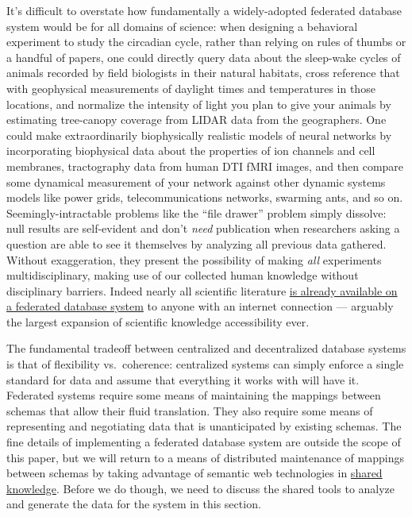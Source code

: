 \documentclass{article}
\begin{document}
It's difficult to overstate how fundamentally a widely-adopted federated
database system would be for all domains of science: when designing a
behavioral experiment to study the circadian cycle, rather than relying
on rules of thumbs or a handful of papers, one could directly query data
about the sleep-wake cycles of animals recorded by field biologists in
their natural habitats, cross reference that with geophysical
measurements of daylight times and temperatures in those locations, and
normalize the intensity of light you plan to give your animals by
estimating tree-canopy coverage from LIDAR data from the geographers.
One could make extraordinarily biophysically realistic models of neural
networks by incorporating biophysical data about the properties of ion
channels and cell membranes, tractography data from human DTI fMRI
images, and then compare some dynamical measurement of your network
against other dynamic systems models like power grids,
telecommunications networks, swarming ants, and so on.
Seemingly-intractable problems like the ``file drawer'' problem simply
dissolve: null results are self-evident and don't \emph{need}
publication when researchers asking a question are able to see it
themselves by analyzing all previous data gathered. Without
exaggeration, they present the possibility of making \emph{all}
experiments multidisciplinary, making use of our collected human
knowledge without disciplinary barriers. Indeed nearly all scientific
literature \href{https://freeread.org/ipfs/}{is already available on a
federated database system} to anyone with an internet connection ---
arguably the largest expansion of scientific knowledge accessibility
ever.

The fundamental tradeoff between centralized and decentralized database
systems is that of flexibility vs.~coherence: centralized systems can
simply enforce a single standard for data and assume that everything it
works with will have it. Federated systems require some means of
maintaining the mappings between schemas that allow their fluid
translation. They also require some means of representing and
negotiating data that is unanticipated by existing schemas. The fine
details of implementing a federated database system are outside the
scope of this paper, but we will return to a means of distributed
maintenance of mappings between schemas by taking advantage of semantic
web technologies in \protect\hyperlink{shared-knowledge}{shared
knowledge}. Before we do though, we need to discuss the shared tools to
analyze and generate the data for the system in this section.
\end{document}
